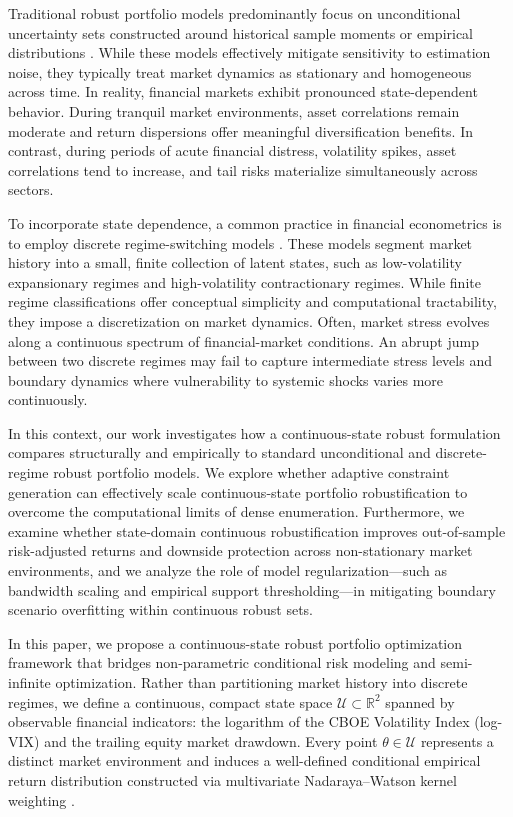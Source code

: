 \documentclass[smallcondensed]{svjour3}
\begin{document}
Traditional robust portfolio models predominantly focus on unconditional uncertainty sets constructed around historical sample moments or empirical distributions \cite{delage2010distributionally, esfahani2018data}. While these models effectively mitigate sensitivity to estimation noise, they typically treat market dynamics as stationary and homogeneous across time. In reality, financial markets exhibit pronounced state-dependent behavior. During tranquil market environments, asset correlations remain moderate and return dispersions offer meaningful diversification benefits. In contrast, during periods of acute financial distress, volatility spikes, asset correlations tend to increase, and tail risks materialize simultaneously across sectors.

To incorporate state dependence, a common practice in financial econometrics is to employ discrete regime-switching models \cite{ang2002international}. These models segment market history into a small, finite collection of latent states, such as low-volatility expansionary regimes and high-volatility contractionary regimes. While finite regime classifications offer conceptual simplicity and computational tractability, they impose a discretization on market dynamics. Often, market stress evolves along a continuous spectrum of financial-market conditions. An abrupt jump between two discrete regimes may fail to capture intermediate stress levels and boundary dynamics where vulnerability to systemic shocks varies more continuously.


In this context, our work investigates how a continuous-state robust formulation compares structurally and empirically to standard unconditional and discrete-regime robust portfolio models. We explore whether adaptive constraint generation can effectively scale continuous-state portfolio robustification to overcome the computational limits of dense enumeration. Furthermore, we examine whether state-domain continuous robustification improves out-of-sample risk-adjusted returns and downside protection across non-stationary market environments, and we analyze the role of model regularization---such as bandwidth scaling and empirical support thresholding---in mitigating boundary scenario overfitting within continuous robust sets.

In this paper, we propose a continuous-state robust portfolio optimization framework that bridges non-parametric conditional risk modeling and semi-infinite optimization. Rather than partitioning market history into discrete regimes, we define a continuous, compact state space $\mathcal{U} \subset \mathbb{R}^2$ spanned by observable financial indicators: the logarithm of the CBOE Volatility Index (log-VIX) \cite{cboe2026vix} and the trailing equity market drawdown. Every point $\theta \in \mathcal{U}$ represents a distinct market environment and induces a well-defined conditional empirical return distribution constructed via multivariate Nadaraya--Watson kernel weighting \cite{nadaraya1964estimating, watson1964smooth}.
\end{document}
